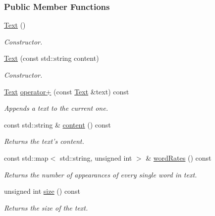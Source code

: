 \subsubsection*{Public Member Functions}
\begin{CompactItemize}
\item 
\hyperlink{class_text_b3e26143fccc52699bcc5149cae852bc}{Text} ()
\begin{CompactList}\small\item\em Constructor. \item\end{CompactList}\item 
\hyperlink{class_text_c3c20ee8baeb7b88e2622724f57e50a2}{Text} (const std::string content)
\begin{CompactList}\small\item\em Constructor. \item\end{CompactList}\item 
\hyperlink{class_text}{Text} \hyperlink{class_text_c8887fb224e0402448ede4f3b9f7452d}{operator+} (const \hyperlink{class_text}{Text} \&text) const 
\begin{CompactList}\small\item\em Appends a text to the current one. \item\end{CompactList}\item 
const std::string \& \hyperlink{class_text_8b6ac381338c5b3f719600b5f9be222c}{content} () const 
\begin{CompactList}\small\item\em Returns the text's content. \item\end{CompactList}\item 
const std::map$<$ std::string, unsigned int $>$ \& \hyperlink{class_text_f1588ae161a4c4894b2ce1a1d29ebc22}{wordRates} () const 
\begin{CompactList}\small\item\em Returns the number of appearances of every single word in text. \item\end{CompactList}\item 
unsigned int \hyperlink{class_text_b66729ba84c2698ed888f641b3838a8b}{size} () const 
\begin{CompactList}\small\item\em Returns the size of the text. \item\end{CompactList}\item 

\end{CompactItemize}
